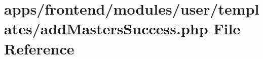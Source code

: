 \hypertarget{frontend_2modules_2user_2templates_2add_masters_success_8php}{\section{apps/frontend/modules/user/templates/add\-Masters\-Success.php File Reference}
\label{frontend_2modules_2user_2templates_2add_masters_success_8php}
}

